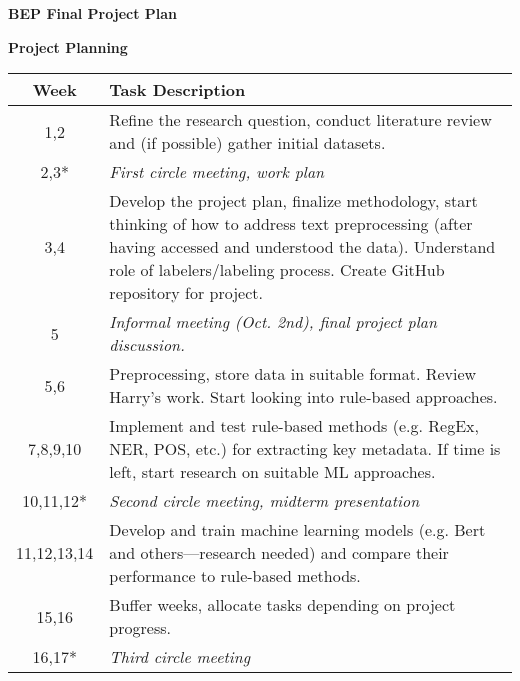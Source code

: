 \documentclass[11pt]{article}
\begin{document}

\begin{center}
{\bf BEP Final Project Plan}
\end{center}


\textbf{Project Planning}

\begin{table}[ht]
\centering
\begin{tabular}{|c|p{12cm}|}  %
\hline

\textbf{Week} & \textbf{Task Description} \\ \hline
1,2 & Refine the research question, conduct literature review and (if possible) gather initial datasets. \\ \hline

2,3* & \textit{First circle meeting, work plan} \\ \hline

3,4 & Develop the project plan, finalize methodology, start thinking of how to address text preprocessing (after having accessed and understood the data). Understand role of labelers/labeling process. Create GitHub repository for project. \\ \hline

5 & \textit{Informal meeting (Oct. 2nd), final project plan discussion.} \\ \hline \hline

5,6 & Preprocessing, store data in suitable format. Review Harry's work. Start looking into rule-based approaches. \\ \hline

7,8,9,10 & Implement and test rule-based methods (e.g. RegEx, NER, POS, etc.) for extracting key metadata. If time is left, start research on suitable ML approaches. \\ \hline

10,11,12* & \textit{Second circle meeting, midterm presentation} \\ \hline

11,12,13,14 & Develop and train machine learning models (e.g. Bert and others—research needed) and compare their performance to rule-based methods. \\ \hline

15,16 & Buffer weeks, allocate tasks depending on project progress. \\ \hline \hline

16,17* & \textit{Third circle meeting} \\ \hline


\end{tabular}
\end{table}
\end{document}

